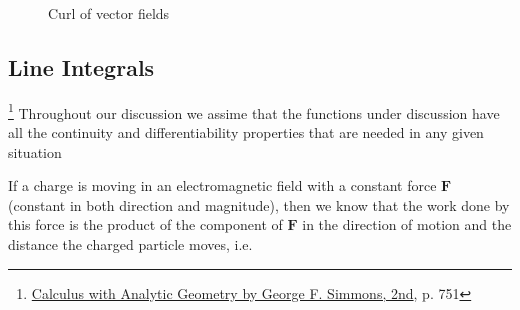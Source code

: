 \begin{figure}[H]
\begin{subfigure}{.19\textwidth}
    \end{subfigure}
    \begin{subfigure}{.19\textwidth}
        \centering
    \end{subfigure}
    \begin{subfigure}{.19\textwidth}
        \centering
    \end{subfigure}
    \caption{Curl of vector fields}
    \label{fig:curl-examples}
\end{figure}

\subsection{Line Integrals}

\footnote{\href{https://trello.com/c/byu9Pyy8}{Calculus with Analytic Geometry by George F. Simmons, 2nd}, p. 751}
Throughout our discussion we assime that the functions under discussion have all the continuity and differentiability
properties that are needed in any given situation

If a charge is moving in an electromagnetic field with a constant force $\boldsymbol{F}$ (constant in both direction and
magnitude), then we know that the work done by this force is the product of the component of $\boldsymbol{F}$ in the
direction of motion and the distance the charged particle moves, i.e.

